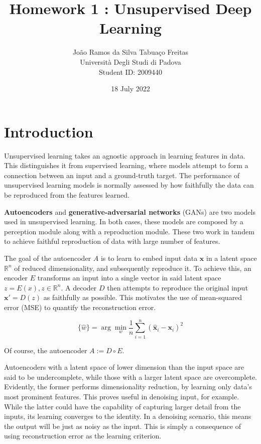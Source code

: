 \documentclass[11pt]{article} %
\title{Homework 1 : Unsupervised Deep Learning}
\author{João Ramos da Silva Tabuaço Freitas \\ Università Degli Studi di Padova \\ Student ID: 2009440}
\date{18 July 2022} %
\begin{document}
\maketitle

\section*{Introduction}
Unsupervised learning takes an agnostic approach in learning features in data. This distinguishes it from supervised learning, where models attempt to form a connection between an input and a ground-truth target. The performance of unsupervised learning models is normally assessed by how faithfully the data can be reproduced from the features learned.

\textbf{Autoencoders} and \textbf{generative-adversarial networks} (GANs) are two models used in unsupervised learning. In both cases, these models are composed by a perception module along with a reproduction module. These two work in tandem to achieve faithful reproduction of data with large number of features.

\noindent The goal of the autoencoder $A$ is to learn to embed input data $\mathbf{x}$ in a latent space $\mathbb{R}^{n}$ of reduced dimensionality, and subsequently reproduce it. To achieve this, an encoder $E$ transforms an input into a single vector in said latent space $z = E(x), z \in \mathbb{R}^{n}$. A decoder $D$ then attempts to reproduce the original input $\mathbf{x}' = D(z)$ as faithfully as possible. This motivates the use of mean-squared error (MSE) to quantify the reconstruction error.

\begin{equation}
    \{\hat{w}\}= \arg\min_{w} \frac{1}{n}\sum_{i = 1}^{n}\left(\hat{\mathbf{x}}_i - \mathbf{x}_i\right)^{2}
\end{equation}

\noindent Of course, the autoencoder $A := D \circ E$.

\noindent Autoencoders with a latent space of lower dimension than the input space are said to be undercomplete, while those with a larger latent space are overcomplete. Evidently, the former performs dimensionality reduction, by learning only data's most prominent features. This proves useful in denoising input, for example. While the latter could have the capability of capturing larger detail from the inputs, its learning converges to the identity. In a denoising scenario, this means the output will be just as noisy as the input. This is simply a consequence of using reconstruction error as the learning criterion.
\end{document}
